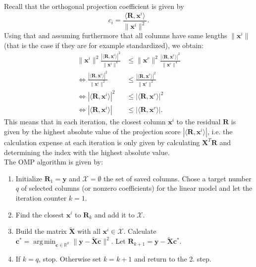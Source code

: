 \documentclass[11pt, a4paper, parskip=half*, bibliography=totoc, cleardoublepage=empty, final,
numbers=noenddot]{scrbook}
\DeclareMathOperator*{\argmin}{arg\,min}
\begin{document}
Recall that the orthogonal projection coefficient is given by 
\begin{equation}
c_i =  \frac{\langle \bm{R}, \bm{x}^i \rangle}{\|\bm{x}^i\|^2} . 
\end{equation}
Using that and assuming furthermore that all columns have same lengths $\|\bm{x}^i\|$ (that is the case if they are for example standardized), we obtain:
\begin{align}
\| \bm{x}^i\|^2 \frac{|\langle \bm{R}, \bm{x}^i \rangle|^2}{\|\bm{x}^i\|^4}  &\leq  \|\bm{x}^r \|^2  \frac{|\langle \bm{R}, \bm{x}^r \rangle|^2}{\|\bm{x}^r\|^4} \\
\Leftrightarrow  \frac{|\langle \bm{R}, \bm{x}^i \rangle|^2}{\|\bm{x}^i\|^2}  &\leq   \frac{|\langle \bm{R}, \bm{x}^r \rangle|^2}{\|\bm{x}^r\|^2} \\
\Leftrightarrow  |\langle \bm{R}, \bm{x}^i \rangle|^2  &\leq   |\langle \bm{R}, \bm{x}^r \rangle|^2 \\
\Leftrightarrow  |\langle \bm{R}, \bm{x}^i \rangle|  &\leq   |\langle \bm{R}, \bm{x}^r \rangle|.
\end{align}
This means that in each iteration, the closest column $\bm{x}^i$ to the residual $\bm{R}$ is given by the highest absolute value of the projection score $|\langle \bm{R}, \bm{x}^i \rangle|$, i.e. the calculation expense at each iteration is only given by calculating $\bm{X}^T \bm{R}$ and determining the index with the highest absolute value.\\
The OMP algorithm is given by:
\begin{enumerate}
\item Initialize $\bm{R}_1 =\bm{y}$ and $\mathcal{X}=\emptyset$ the set of saved columns. Chose a target number $q$ of selected columns (or nonzero coefficients) for the linear model and let the iteration counter $k=1$.
\item Find the closest $\bm{x}^i$ to $\bm{R}_k$ and add it to $\mathcal{X}$. 
\item Build the matrix $\tilde{\bm{X}}$ with all $\bm{x}^i \in \mathcal{X}$. Calculate $\bm{c}^* = \argmin_{\bm{c} \in \mathbb{R}^{k}} \| \bm{y} - \tilde{\bm{X}} \bm{c} \|^2$. Let $\bm{R}_{k+1} =\bm{y} - \tilde{\bm{X}} \bm{c}^*$.
\item If $k=q$, stop. Otherwise set $k=k+1$ and return to the 2. step.
\end{enumerate}
\end{document}
